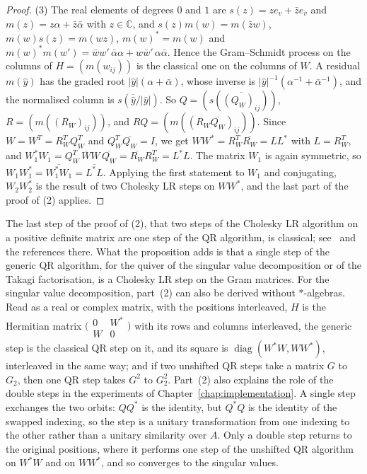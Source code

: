 \documentclass[12pt, a4paper]{report}
\theoremstyle{plain}
\theoremstyle{definition}
\theoremstyle{remark}
\theoremstyle{plain}
\newcommand{\CC}{\mathbb{C}}
\DeclareMathOperator{\diag}{diag}
\begin{document}
\begin{proof}
(3) The real elements of degrees $0$ and $1$ are $s(z)=ze_v+\bar ze_{\bar v}$ and $m(z)=z\alpha+\bar z\bar\alpha$ with $z\in\CC$, and $s(z)m(w)=m(\bar zw)$, $m(w)s(z)=m(wz)$, $m(w)^*=m(w)$ and $m(w)^*m(w')=\bar ww'\,\bar\alpha\alpha+w\bar w'\,\alpha\bar\alpha$. Hence the Gram--Schmidt process on the columns of $H=(m(w_{ij}))$ is the classical one on the columns of $W$. A residual $m(\hat y)$ has the graded root $|\hat y|(\alpha+\bar\alpha)$, whose inverse is $|\hat y|^{-1}(\alpha^{-1}+\bar\alpha^{-1})$, and the normalised column is $s(\overline{\hat y}/|\hat y|)$. So $Q=(s(\overline{(Q_W)_{ij}}))$, $R=(m((R_W)_{ij}))$, and $RQ=(m((R_W\overline{Q_W})_{ij}))$. Since $W=W^T=R_W^TQ_W^T$ and $Q_W^T\overline{Q_W}=I$, we get $WW^*=R_W^T\overline{R_W}=LL^*$ with $L=R_W^T$, and $W_1^*W_1=Q_W^T\,\overline WW\,\overline{Q_W}=\overline{R_W}R_W^T=L^*L$. The matrix $W_1$ is again symmetric, so $W_1W_1^*=\overline{W_1^*W_1}=\overline{L^*L}$. Applying the first statement to $W_1$ and conjugating, $W_2W_2^*$ is the result of two Cholesky LR steps on $WW^*$, and the last part of the proof of (2) applies.
\end{proof}

The last step of the proof of (2), that two steps of the Cholesky LR algorithm on a positive definite matrix are one step of the QR algorithm, is classical; see~\cite{Xu1998} and the references there. What the proposition adds is that a single step of the generic QR algorithm, for the quiver of the singular value decomposition or of the Takagi factorisation, is a Cholesky LR step on the Gram matrices. For the singular value decomposition, part~(2) can also be derived without $*$-algebras. Read as a real or complex matrix, with the positions interleaved, $H$ is the Hermitian matrix $\bigl(\begin{smallmatrix}0&W^*\\W&0\end{smallmatrix}\bigr)$ with its rows and columns interleaved, the generic step is the classical QR step on it, and its square is $\diag(W^*W,WW^*)$, interleaved in the same way; and if two unshifted QR steps take a matrix $G$ to $G_2$, then one QR step takes $G^2$ to $G_2^2$. Part~(2) also explains the role of the double steps in the experiments of Chapter~\ref{chap:implementation}. A single step exchanges the two orbits: $QQ^*$ is the identity, but $Q^*Q$ is the identity of the swapped indexing, so the step is a unitary transformation from one indexing to the other rather than a unitary similarity over $A$. Only a double step returns to the original positions, where it performs one step of the unshifted QR algorithm on $W^*W$ and on $WW^*$, and so converges to the singular values.
\end{document}
